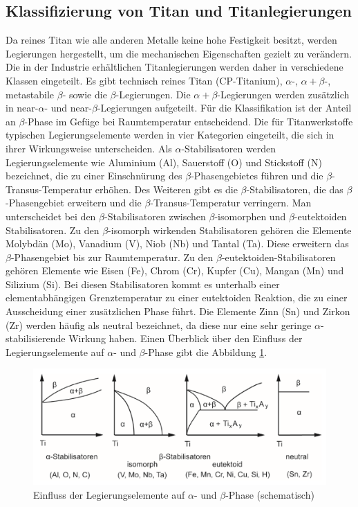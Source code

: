 \subsection{Klassifizierung von Titan und Titanlegierungen}

Da reines Titan wie alle anderen Metalle keine hohe Festigkeit besitzt, werden Legierungen hergestellt, um die mechanischen Eigenschaften gezielt zu verändern. Die in der Industrie erhältlichen Titanlegierungen werden daher in verschiedene Klassen eingeteilt. Es gibt technisch reines Titan (CP-Titanium), $\alpha$-, $\alpha+\beta$-, metastabile $\beta$- sowie die $\beta$-Legierungen. Die $\alpha+\beta$-Legierungen werden zusätzlich in near-$\alpha$- und near-$\beta$-Legierungen aufgeteilt. Für die Klassifikation ist der Anteil an $\beta$-Phase im Gefüge bei Raumtemperatur entscheidend.
Die für Titanwerkstoffe typischen Legierungselemente werden in vier Kategorien eingeteilt, die sich in ihrer Wirkungsweise unterscheiden. 
Als $\alpha$-Stabilisatoren werden Legierungselemente wie Aluminium (Al), Sauerstoff (O) und Stickstoff (N) bezeichnet, die zu einer Einschnürung des $\beta$-Phasengebietes führen und die $\beta$-Transus-Temperatur erhöhen.
Des Weiteren gibt es die $\beta$-Stabilisatoren, die das $\beta$-Phasengebiet erweitern und die $\beta$-Transus-Temperatur verringern. Man unterscheidet bei den $\beta$-Stabilisatoren zwischen $\beta$-isomorphen und $\beta$-eutektoiden Stabilisatoren. Zu den $\beta$-isomorph wirkenden Stabilisatoren gehören die Elemente Molybdän (Mo), Vanadium (V), Niob (Nb) und Tantal (Ta). Diese erweitern das $\beta$-Phasengebiet bis zur Raumtemperatur. 
Zu den $\beta$-eutektoiden-Stabilisatoren gehören Elemente wie Eisen (Fe), Chrom (Cr), Kupfer (Cu), Mangan (Mn) und Silizium (Si). Bei diesen Stabilisatoren kommt es unterhalb einer elementabhängigen Grenztemperatur zu einer eutektoiden Reaktion, die zu einer Ausscheidung einer zusätzlichen Phase führt. Die Elemente Zinn (Sn) und Zirkon (Zr) werden häufig als neutral bezeichnet, da diese nur eine sehr geringe $\alpha$-stabilisierende Wirkung haben. Einen Überblick über den Einfluss der Legierungselemente auf $\alpha$- und $\beta$-Phase gibt die Abbildung \ref{fig:tabelle-1}.

\begin{figure}[h]
	\centering
	\includegraphics[width=0.9\linewidth]{./Bilder/Tabelle 1.png}
	\caption{Einfluss der Legierungselemente auf $\alpha$- und $\beta$-Phase (schematisch) \cite{Lutjering.2007}}
	\label{fig:tabelle-1}
\end{figure}

